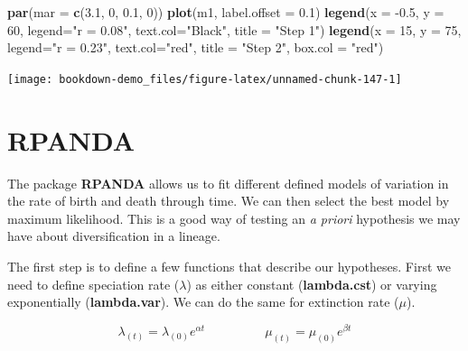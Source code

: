 \documentclass[
]{book}
\newenvironment{Shaded}{\begin{snugshade}}{\end{snugshade}}
\newcommand{\DataTypeTok}[1]{\textcolor[rgb]{0.13,0.29,0.53}{#1}}
\newcommand{\DecValTok}[1]{\textcolor[rgb]{0.00,0.00,0.81}{#1}}
\newcommand{\FloatTok}[1]{\textcolor[rgb]{0.00,0.00,0.81}{#1}}
\newcommand{\KeywordTok}[1]{\textcolor[rgb]{0.13,0.29,0.53}{\textbf{#1}}}
\newcommand{\NormalTok}[1]{#1}
\newcommand{\StringTok}[1]{\textcolor[rgb]{0.31,0.60,0.02}{#1}}
\begin{document}
\begin{Shaded}
\begin{Highlighting}[]
\KeywordTok{par}\NormalTok{(}\DataTypeTok{mar =} \KeywordTok{c}\NormalTok{(}\FloatTok{3.1}\NormalTok{, }\DecValTok{0}\NormalTok{, }\FloatTok{0.1}\NormalTok{, }\DecValTok{0}\NormalTok{))}
\KeywordTok{plot}\NormalTok{(m1, }\DataTypeTok{label.offset =} \FloatTok{0.1}\NormalTok{)}
\KeywordTok{legend}\NormalTok{(}\DataTypeTok{x =} \FloatTok{{-}0.5}\NormalTok{, }\DataTypeTok{y =} \DecValTok{60}\NormalTok{, }\DataTypeTok{legend=}\StringTok{"r = 0.08"}\NormalTok{,}
       \DataTypeTok{text.col=}\StringTok{"Black"}\NormalTok{, }\DataTypeTok{title =} \StringTok{"Step 1"}\NormalTok{)}
\KeywordTok{legend}\NormalTok{(}\DataTypeTok{x =} \DecValTok{15}\NormalTok{, }\DataTypeTok{y =} \DecValTok{75}\NormalTok{, }\DataTypeTok{legend=}\StringTok{"r = 0.23"}\NormalTok{,}
       \DataTypeTok{text.col=}\StringTok{"red"}\NormalTok{, }\DataTypeTok{title =} \StringTok{"Step 2"}\NormalTok{, }\DataTypeTok{box.col =} \StringTok{"red"}\NormalTok{)}
\end{Highlighting}
\end{Shaded}

\begin{center}\texttt{[image: bookdown-demo\_files/figure-latex/unnamed-chunk-147-1]} \end{center}

\hypertarget{rpanda}{%
\section{RPANDA}\label{rpanda}}

The package \textbf{RPANDA} \citep{rpanda} allows us to fit different defined models of variation in the rate of birth and death through time. We can then select the best model by maximum likelihood. This is a good way of testing an \emph{a priori} hypothesis we may have about diversification in a lineage.

The first step is to define a few functions that describe our hypotheses. First we need to define speciation rate (\(\lambda\)) as either constant (\textbf{lambda.cst}) or varying exponentially (\textbf{lambda.var}). We can do the same for extinction rate (\(\mu\)).

\[ \lambda_{(t)} = \lambda_{(0)}e^{\alpha t} \;\;\;\;\;\;\;\;\;\;\;\;\;\;\;\;\;  \mu_{(t)} = \mu_{(0)}e^{\beta t} \]
\end{document}
